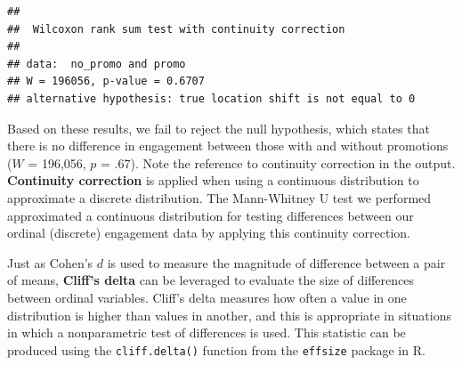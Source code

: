 \documentclass[
]{book}
\newenvironment{Shaded}{\begin{snugshade}}{\end{snugshade}}
\newcommand{\AttributeTok}[1]{\textcolor[rgb]{0.77,0.63,0.00}{#1}}
\newcommand{\CommentTok}[1]{\textcolor[rgb]{0.56,0.35,0.01}{\textit{#1}}}
\newcommand{\DecValTok}[1]{\textcolor[rgb]{0.00,0.00,0.81}{#1}}
\newcommand{\FunctionTok}[1]{\textcolor[rgb]{0.00,0.00,0.00}{#1}}
\newcommand{\NormalTok}[1]{#1}
\newcommand{\OtherTok}[1]{\textcolor[rgb]{0.56,0.35,0.01}{#1}}
\newcommand{\SpecialCharTok}[1]{\textcolor[rgb]{0.00,0.00,0.00}{#1}}
\begin{document}
\begin{Shaded}
\end{Shaded}

\begin{verbatim}
## 
##  Wilcoxon rank sum test with continuity correction
## 
## data:  no_promo and promo
## W = 196056, p-value = 0.6707
## alternative hypothesis: true location shift is not equal to 0
\end{verbatim}

Based on these results, we fail to reject the null hypothesis, which states that there is no difference in engagement between those with and without promotions (\(W\) = 196,056, \(p\) = .67). Note the reference to continuity correction in the output. \textbf{Continuity correction} is applied when using a continuous distribution to approximate a discrete distribution. The Mann-Whitney U test we performed approximated a continuous distribution for testing differences between our ordinal (discrete) engagement data by applying this continuity correction.

Just as Cohen's \(d\) is used to measure the magnitude of difference between a pair of means, \textbf{Cliff's delta} can be leveraged to evaluate the size of differences between ordinal variables. Cliff's delta measures how often a value in one distribution is higher than values in another, and this is appropriate in situations in which a nonparametric test of differences is used. This statistic can be produced using the \texttt{cliff.delta()} function from the \texttt{effsize} package in R.
\end{document}
